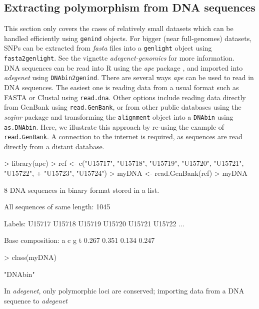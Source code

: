 \documentclass{article}
\begin{document}
\subsection{Extracting polymorphism from DNA sequences}
This section only covers the cases of relatively small datasets which can be handled efficiently
using \texttt{genind} objects. For bigger (near full-genomes) datasets, SNPs can be extracted from
\textit{fasta} files into a \texttt{genlight} object using \texttt{fasta2genlight}.
See the vignette \textit{adegenet-genomics} for more information.
\\


DNA sequences can be read into R using the \textit{ape} package \cite{tj527}, and
imported into \textit{adegenet} using \texttt{DNAbin2genind}.
There are several ways \textit{ape}  can be used to read in DNA sequences.
The easiest one is reading data from a usual format such as FASTA or Clustal using \texttt{read.dna}.
Other options include reading data directly from GenBank using \texttt{read.GenBank}, or from other
public databases using the \textit{seqinr} package and transforming the \texttt{alignment} object into a
\texttt{DNAbin} using \texttt{as.DNAbin}.
Here, we illustrate this approach by re-using the example of \texttt{read.GenBank}. A connection to
the internet is required, as sequences are read directly from a distant database.
\begin{Schunk}
\begin{Sinput}
> library(ape)
> ref <- c("U15717", "U15718", "U15719", "U15720", "U15721", "U15722", 
+     "U15723", "U15724")
> myDNA <- read.GenBank(ref)
> myDNA
\end{Sinput}
\begin{Soutput}
8 DNA sequences in binary format stored in a list.

All sequences of same length: 1045 

Labels: U15717 U15718 U15719 U15720 U15721 U15722 ...

Base composition:
    a     c     g     t 
0.267 0.351 0.134 0.247 
\end{Soutput}
\begin{Sinput}
> class(myDNA)
\end{Sinput}
\begin{Soutput}
[1] "DNAbin"
\end{Soutput}
\end{Schunk}
In \textit{adegenet}, only polymorphic loci are conserved; importing data from a DNA sequence to \textit{adegenet}
\end{document}
